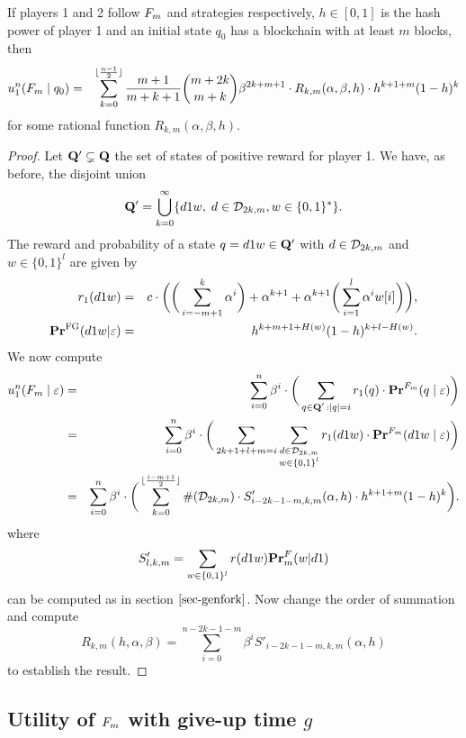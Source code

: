 \begin{myprop}
\label{prop-utilitymforkfinite}
If players 1 and 2 follow $F_m$ and \df strategies respectively, $h\in [0,1]$ is the hash power of player 1 and an initial state $q_0$ has a blockchain with at least $m$ blocks, then
\begin{eqnarray*}
	u_1^n(F_m \mid q_0) & = & \sum_{k=0}^{\lfloor\frac{n-1}{2}\rfloor}\frac{m+1}{m+k+1}{m+2k\choose m+k}\beta^{2k+m+1}  \cdot R_{k,m}(\alpha,\beta,h)\cdot h^{k+1+m}(1-h)^{k}
\end{eqnarray*}
for some rational function $R_{k,m}(\alpha,\beta,h)$.
\end{myprop}
\begin{proof}
	Let $\mathbf{Q}'\subsetneq \mathbf{Q}$ the set of states of positive reward for player 1. We have, as before, the disjoint union
	$$\mathbf{Q}' = \bigcup_{k=0}^\infty \{d1w,\; d\in\mathcal{D}_{2k,m}, w\in\{0,1\}^\ast\}.$$
	The reward and probability of a state $q=d1w\in \mathbf{Q}'$ with $d\in\mathcal{D}_{2k,m}$ and $w\in\{0,1\}^l$ are given by
\begin{eqnarray*}
	r_1(d1w) &=& c\cdot \bigg(\bigg(\sum_{i=-m+1}^{k}\alpha^i \bigg)+\alpha^{k+1}+\alpha^{k+1}\bigg(\sum_{i=1}^{l}\alpha^i w[i]\bigg)\bigg),\\
	\mathbf{Pr}^{\text{\rm FG}}(d1w|\varepsilon) &=& h^{k+m+1+H(w)}(1-h)^{k+l-H(w)}.
\end{eqnarray*} 
We now compute
\begin{eqnarray*}
	u_1^n(F_m \mid \varepsilon) & = & \sum_{i=0}^{n}\beta^{i} \cdot  \bigg(\sum_{\substack{q \in \mathbf{Q}' \,: |q| = i}} r_1(q) \cdot 
	\mathbf{Pr}^{F_m}(q \mid \varepsilon)\bigg)\\
								   & = & \sum_{i=0}^{n}\beta^{i} \cdot  \bigg(\sum_{2k+1+l+m=i}\sum_{\substack{d\in \mathcal{D}_{2k,m}\\w\in\{0,1\}^l}} r_1(d1w) \cdot 
	\mathbf{Pr}^{F_m}(d1w \mid \varepsilon)\bigg)\\
								   & = & \sum_{i=0}^{n}\beta^{i} \cdot  \bigg(\sum_{k=0}^{\lfloor\frac{i-m+1}{2}\rfloor} \#(\mathcal{D}_{2k,m})\cdot S'_{i-2k-1-m,k,m}(\alpha,h)\cdot h^{k+1+m}(1-h)^{k}\bigg).
\end{eqnarray*}
where
$$S'_{l,k,m}=\sum_{w\in\{0,1\}^l}r(d1w)\mathbf{Pr}^F_m(w|d1)$$
can be computed as in section $\ref{sec-genfork}$. Now change the order of summation and compute 
$$R_{k,m}(h,\alpha,\beta)=\sum_{i=0}^{n-2k-1-m}\beta^{i}S'_{i-2k-1-m,k,m}(\alpha,h)$$ 
to establish the result.\end{proof}

\subsection{Utility of $F_m$ with give-up time $g$}

